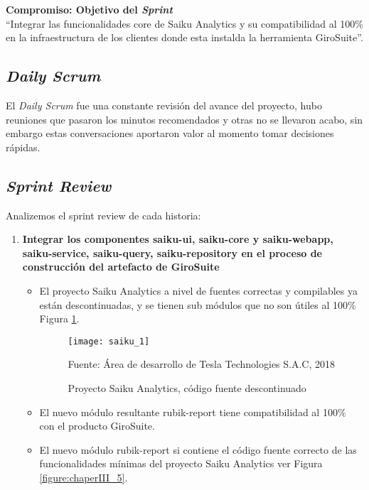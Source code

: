 \begin{spacing}{1.5}
		\textbf{Compromiso: Objetivo del \textit{Sprint}}\\
	``Integrar las funcionalidades core de Saiku Analytics y su compatibilidad al 100\% en la infraestructura de los clientes donde esta instalda la herramienta GiroSuite''.\\
		
	\subsection{\textit{Daily Scrum}}
		El \textit{Daily Scrum} fue una constante revisi\'{o}n del avance del proyecto, hubo reuniones que pasaron los minutos recomendados y otras no se llevaron acabo, sin embargo estas conversaciones aportaron valor al momento tomar decisiones r\'{a}pidas.
	
	\clearpage		
	\subsection{\textit{Sprint Review}}
		Analizemos el sprint review de cada historia:
		
		\begin{enumerate}
			
			\item \textbf{Integrar los componentes saiku-ui, saiku-core y saiku-webapp, saiku-service, saiku-query, saiku-repository en el proceso de construcción del artefacto de GiroSuite}
				\begin{itemize}
					\item El proyecto Saiku Analytics a nivel de fuentes correctas y compilables ya est\'{a}n descontinuadas, y se tienen sub m\'{o}dulos que no son \'{u}tiles al 100\% Figura \ref{figure:chaperIII_4}.
					
					\begin{figure}[H]
						\centering
						\texttt{[image: saiku\_1]}
						\caption {\centering \small{Proyecto Saiku Analytics, c\'{o}digo fuente descontinuado}} \label{figure:chaperIII_4}
						\small {Fuente: \'{A}rea de desarrollo de Tesla Technologies S.A.C, 2018}
					\end{figure}
					\item El nuevo m\'{o}dulo resultante rubik-report tiene compatibilidad al 100\% con el producto GiroSuite.
					\item El nuevo m\'{o}dulo rubik-report si contiene el c\'{o}digo fuente correcto de las funcionalidades m\'{i}nimas del proyecto Saiku Analytics ver Figura \ref{figure:chaperIII_5}.
					

\end{itemize}
\end{enumerate}
\end{spacing}
